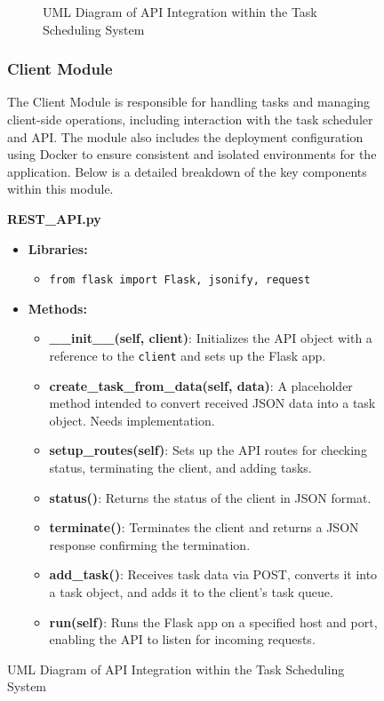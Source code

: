 \documentclass{article}
\begin{document}
\begin{figure}[h!]
\begin{figure}[h!]
{
}
\caption{UML Diagram of API Integration within the Task Scheduling System}
\end{figure}

\subsubsection{Client Module}

The Client Module is responsible for handling tasks and managing client-side operations, including interaction with the task scheduler and API. The module also includes the deployment configuration using Docker to ensure consistent and isolated environments for the application. Below is a detailed breakdown of the key components within this module.

\begin{itemize}{
    \item \textbf{REST\_API.py}
    \begin{itemize}
        \item \textbf{Libraries:}
        \begin{itemize}
            \item \texttt{from flask import Flask, jsonify, request}
        \end{itemize}
        \item \textbf{Methods:}
        \begin{itemize}
            \item \textbf{\_\_init\_\_(self, client)}: Initializes the API object with a reference to the \texttt{client} and sets up the Flask app.
            \item \textbf{create\_task\_from\_data(self, data)}: A placeholder method intended to convert received JSON data into a task object. Needs implementation.
            \item \textbf{setup\_routes(self)}: Sets up the API routes for checking status, terminating the client, and adding tasks.
            \item \textbf{status()}: Returns the status of the client in JSON format.
            \item \textbf{terminate()}: Terminates the client and returns a JSON response confirming the termination.
            \item \textbf{add\_task()}: Receives task data via POST, converts it into a task object, and adds it to the client's task queue.
            \item \textbf{run(self)}: Runs the Flask app on a specified host and port, enabling the API to listen for incoming requests.
        \end{itemize}
    \end{itemize}

}
\end{itemize}
\end{figure}
\end{document}
